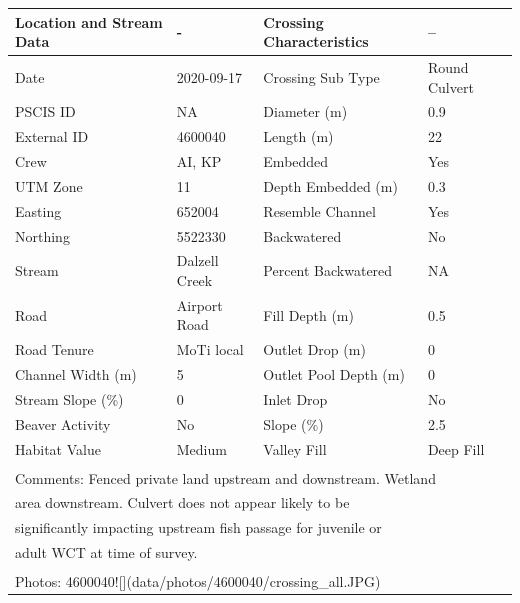 \documentclass[
]{book}
\begin{document}
\begin{tabular}{llll}
\toprule
Location and Stream Data & - & Crossing Characteristics & --\\
\midrule
Date & 2020-09-17 & Crossing Sub Type & Round Culvert\\
PSCIS ID & NA & Diameter (m) & 0.9\\
External ID & 4600040 & Length (m) & 22\\
Crew & AI, KP & Embedded & Yes\\
UTM Zone & 11 & Depth Embedded (m) & 0.3\\
\addlinespace
Easting & 652004 & Resemble Channel & Yes\\
Northing & 5522330 & Backwatered & No\\
Stream & Dalzell Creek & Percent Backwatered & NA\\
Road & Airport Road & Fill Depth (m) & 0.5\\
Road Tenure & MoTi local & Outlet Drop (m) & 0\\
\addlinespace
Channel Width (m) & 5 & Outlet Pool Depth (m) & 0\\
Stream Slope (\%) & 0 & Inlet Drop & No\\
Beaver Activity & No & Slope (\%) & 2.5\\
Habitat Value & Medium & Valley Fill & Deep Fill\\
\bottomrule
\multicolumn{4}{l}{\textsuperscript{} Comments: Fenced private land upstream and downstream. Wetland}\\
\multicolumn{4}{l}{area downstream.  Culvert does not appear likely to be}\\
\multicolumn{4}{l}{significantly impacting upstream fish passage for juvenile or}\\
\multicolumn{4}{l}{adult WCT at time of survey.}\\
\multicolumn{4}{l}{\textsuperscript{} Photos: 4600040![](data/photos/4600040/crossing\_all.JPG)}\\
\end{tabular}
\end{document}
